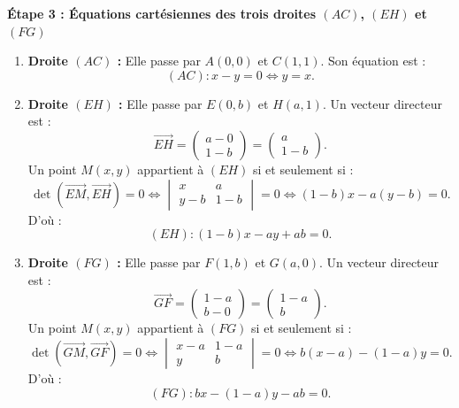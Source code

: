\documentclass[11pt,a4paper]{article}
\newcommand{\vect}[1]{\overrightarrow{#1}}
\renewcommand{\det}{\operatorname{det}}
\begin{document}
\begin{correctionbox}
\textbf{Étape 3 : Équations cartésiennes des trois droites $(AC)$, $(EH)$ et $(FG)$}
\begin{enumerate}[leftmargin=1cm]
    \item \textbf{Droite $(AC)$ :} Elle passe par $A(0,0)$ et $C(1,1)$. Son équation est :
    \[
    (AC) : x - y = 0 \iff y = x.
    \]
    \item \textbf{Droite $(EH)$ :} Elle passe par $E(0, b)$ et $H(a, 1)$. Un vecteur directeur est :
    \[
    \vect{EH} = \begin{pmatrix} a - 0 \\ 1 - b \end{pmatrix} = \begin{pmatrix} a \\ 1 - b \end{pmatrix}.
    \]
    Un point $M(x, y)$ appartient à $(EH)$ si et seulement si :
    \[
    \det(\vect{EM}, \vect{EH}) = 0 \iff \begin{vmatrix} x & a \\ y - b & 1 - b \end{vmatrix} = 0 \iff (1 - b)x - a(y - b) = 0.
    \]
    D'où :
    \[
    (EH) : (1 - b)x - ay + ab = 0.
    \]
    \item \textbf{Droite $(FG)$ :} Elle passe par $F(1, b)$ et $G(a, 0)$. Un vecteur directeur est :
    \[
    \vect{GF} = \begin{pmatrix} 1 - a \\ b - 0 \end{pmatrix} = \begin{pmatrix} 1 - a \\ b \end{pmatrix}.
    \]
    Un point $M(x, y)$ appartient à $(FG)$ si et seulement si :
    \[
    \det(\vect{GM}, \vect{GF}) = 0 \iff \begin{vmatrix} x - a & 1 - a \\ y & b \end{vmatrix} = 0 \iff b(x - a) - (1 - a)y = 0.
    \]
    D'où :
    \[
    (FG) : bx - (1 - a)y - ab = 0.
    \]
\end{enumerate}


\end{correctionbox}
\end{document}
